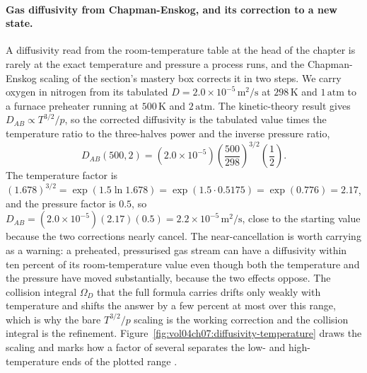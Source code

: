 \paragraph{Gas diffusivity from Chapman-Enskog, and its correction to a new
state.} A diffusivity read from the room-temperature table at the head of the
chapter is rarely at the exact temperature and pressure a process runs, and
the Chapman-Enskog scaling of the section's mastery box corrects it in two
steps. We carry oxygen in nitrogen from its tabulated $D = 2.0\times 10^{-5}
\,\si{\meter\squared\per\second}$ at $298\,\si{\kelvin}$ and $1\,\text{atm}$
to a furnace preheater running at $500\,\si{\kelvin}$ and $2\,\text{atm}$. The
kinetic-theory result gives $D_{AB} \propto T^{3/2}/p$, so the corrected
diffusivity is the tabulated value times the temperature ratio to the
three-halves power and the inverse pressure ratio,
\[
D_{AB}(500,2) = (2.0\times 10^{-5})\left(\frac{500}{298}\right)^{3/2}
\left(\frac{1}{2}\right).
\]
The temperature factor is $(1.678)^{3/2} = \exp(1.5\ln 1.678) =
\exp(1.5\cdot 0.5175) = \exp(0.776) = 2.17$, and the pressure factor is
$0.5$, so $D_{AB} = (2.0\times 10^{-5})(2.17)(0.5) = 2.2\times 10^{-5}\,\si{
\meter\squared\per\second}$, close to the starting value because the two
corrections nearly cancel. The near-cancellation is worth carrying as a
warning: a preheated, pressurised gas stream can have a diffusivity within
ten percent of its room-temperature value even though both the temperature
and the pressure have moved substantially, because the two effects oppose.
The collision integral $\Omega_D$ that the full formula carries drifts only
weakly with temperature and shifts the answer by a few percent at most over
this range, which is why the bare $T^{3/2}/p$ scaling is the working correction
and the collision integral is the refinement.
Figure~\ref{fig:vol04ch07:diffusivity-temperature} draws the scaling and
marks how a factor of several separates the low- and high-temperature ends of
the plotted range \cite{text:bird-transport-phenomena}.



